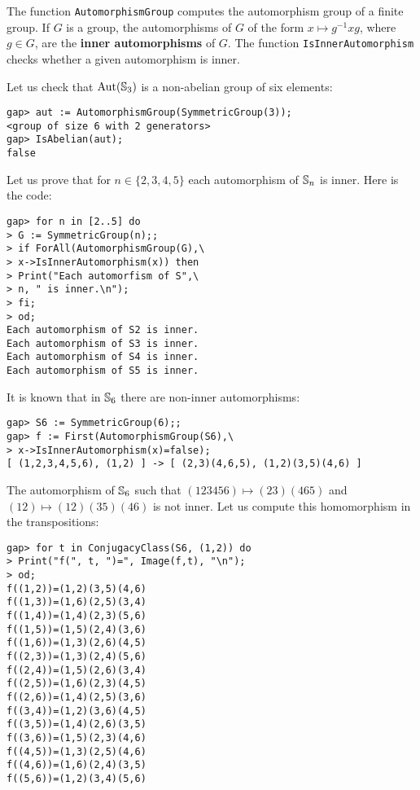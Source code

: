 The function \lstinline{AutomorphismGroup} computes the automorphism group of a
finite group. If $G$ is a group, the automorphisms of $G$ of the form $x\mapsto
g^{-1}xg$, where $g\in G$, are the \textbf{inner automorphisms} of $G$.  The
function \lstinline{IsInnerAutomorphism} checks whether a given automorphism is
inner. 

\begin{example}
Let us check that $\operatorname{Aut}(\mathbb{S}_3)$ is a non-abelian group of six elements:
\begin{lstlisting}
gap> aut := AutomorphismGroup(SymmetricGroup(3));
<group of size 6 with 2 generators>
gap> IsAbelian(aut);
false
\end{lstlisting}
\end{example}

\begin{example}
Let us prove that for $n\in\{2,3,4,5\}$ each automorphism of $\mathbb{S}_n$ is inner. Here is the code:
\begin{lstlisting}
gap> for n in [2..5] do
> G := SymmetricGroup(n);;
> if ForAll(AutomorphismGroup(G),\
> x->IsInnerAutomorphism(x)) then
> Print("Each automorfism of S",\
> n, " is inner.\n");
> fi;
> od;
Each automorphism of S2 is inner.
Each automorphism of S3 is inner.
Each automorphism of S4 is inner.
Each automorphism of S5 is inner.
\end{lstlisting}
It is known that in $\mathbb{S}_6$ there are non-inner automorphisms:
\begin{lstlisting}
gap> S6 := SymmetricGroup(6);;
gap> f := First(AutomorphismGroup(S6),\
> x->IsInnerAutomorphism(x)=false);
[ (1,2,3,4,5,6), (1,2) ] -> [ (2,3)(4,6,5), (1,2)(3,5)(4,6) ]
\end{lstlisting}
The automorphism of $\mathbb{S}_6$ such that 
$(123456)\mapsto (23)(465)$ and $(12)\mapsto(12)(35)(46)$
is not inner. 
Let us compute this homomorphism in the transpositions: 
\begin{lstlisting}
gap> for t in ConjugacyClass(S6, (1,2)) do
> Print("f(", t, ")=", Image(f,t), "\n"); 
> od;
f((1,2))=(1,2)(3,5)(4,6)
f((1,3))=(1,6)(2,5)(3,4)
f((1,4))=(1,4)(2,3)(5,6)
f((1,5))=(1,5)(2,4)(3,6)
f((1,6))=(1,3)(2,6)(4,5)
f((2,3))=(1,3)(2,4)(5,6)
f((2,4))=(1,5)(2,6)(3,4)
f((2,5))=(1,6)(2,3)(4,5)
f((2,6))=(1,4)(2,5)(3,6)
f((3,4))=(1,2)(3,6)(4,5)
f((3,5))=(1,4)(2,6)(3,5)
f((3,6))=(1,5)(2,3)(4,6)
f((4,5))=(1,3)(2,5)(4,6)
f((4,6))=(1,6)(2,4)(3,5)
f((5,6))=(1,2)(3,4)(5,6)
\end{lstlisting}
\end{example}

